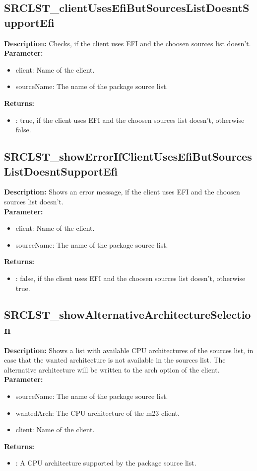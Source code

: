\subsection{SRCLST\_clientUsesEfiButSourcesListDoesntSupportEfi}
\textbf{Description:} Checks, if the client uses EFI and the choosen sources list doesn't.\\
\textbf{Parameter:}
\begin{itemize}
\item client: Name of the client.
\item sourceName: The name of the package source list.
\end{itemize}
\textbf{Returns:}
\begin{itemize}
\item : true, if the client uses EFI and the choosen sources list doesn't, otherwise false.
\end{itemize}

\subsection{SRCLST\_showErrorIfClientUsesEfiButSourcesListDoesntSupportEfi}
\textbf{Description:} Shows an error message, if the client uses EFI and the choosen sources list doesn't.\\
\textbf{Parameter:}
\begin{itemize}
\item client: Name of the client.
\item sourceName: The name of the package source list.
\end{itemize}
\textbf{Returns:}
\begin{itemize}
\item : false, if the client uses EFI and the choosen sources list doesn't, otherwise true.
\end{itemize}

\subsection{SRCLST\_showAlternativeArchitectureSelection}
\textbf{Description:} Shows a list with available CPU architectures of the sources list, in case that the wanted architecture is not available in the sources list. The alternative architecture will be written to the arch option of the client.\\
\textbf{Parameter:}
\begin{itemize}
\item sourceName: The name of the package source list.
\item wantedArch: The CPU architecture of the m23 client.
\item client: Name of the client.
\end{itemize}
\textbf{Returns:}
\begin{itemize}
\item : A CPU architecture supported by the package source list.
\end{itemize}

